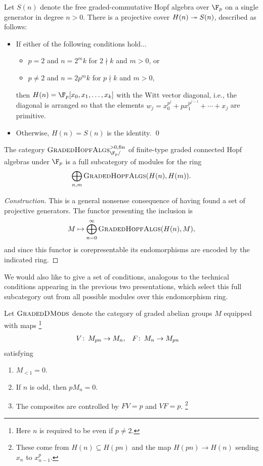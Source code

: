 \begin{theorem}
Let \(S(n)\) denote the free graded-commutative Hopf algebra over \(\F_p\) on a single generator in degree \(n > 0\).
There is a projective cover \(H(n) \twoheadrightarrow S(n)\), described as follows:
\begin{itemize}
\item If either of the following conditions hold...
\begin{itemize}
\item \(p = 2\) and \(n = 2^m k\) for \(2 \nmid k\) and \(m > 0\), or
\item \(p \ne 2\) and \(n = 2p^m k\) for \(p \nmid k\) and \(m > 0\),
\end{itemize}
then \(H(n) = \F_p[x_0, x_1, \ldots, x_k]\) with the Witt vector diagonal, i.e., the diagonal is arranged so that the elements \(w_j = x_0^{p^j} + p x_1^{p^{j-1}} + \cdots + x_j\) are primitive.
\item Otherwise, \(H(n) = S(n)\) is the identity.
\qed
\end{itemize}
\end{theorem}

\begin{corollary}
The category \(\CatOf{GradedHopfAlgs}^{> 0, \fin}_{\F_p/}\) of finite-type graded connected Hopf algebras under \(\F_p\) is a full subcategory of modules for the ring \[\bigoplus_{n, m} \normalfont\textsc{GradedHopfAlgs}(H(n), H(m)).\]
\end{corollary}
\begin{proof}[Construction]
This is a general nonsense consequence of having found a set of projective generators.
The functor presenting the inclusion is \[M \mapsto \bigoplus_{n=0}^\infty \normalfont\textsc{GradedHopfAlgs}(H(n), M),\] and since this functor is corepresentable its endomorphisms are encoded by the indicated ring.
\end{proof}

We would also like to give a set of conditions, analogous to the technical conditions appearing in the previous two presentations, which select this full subcategory out from all possible modules over this endomorphism ring.

\begin{definition}
Let \(\normalfont\textsc{GradedDMods}\) denote the category of graded abelian groups \(M\) equipped with maps%
\footnote{%
Here \(n\) is required to be even if \(p \ne 2\).
}
\begin{align*}
V\colon\thinspace M_{pn} & \to M_n, &
F\colon\thinspace M_n & \to M_{pn}
\end{align*}
satisfying
\begin{enumerate}
\item \(M_{< 1} = 0\).
\item If \(n\) is odd, then \(pM_n = 0\).
\item The composites are controlled by \(FV = p\) and \(VF = p\).%
\footnote{%
These come from \(H(n) \subseteq H(pn)\) and the map \(H(pn) \to H(n)\) sending \(x_n\) to \(x_{n-1}^p\).
}
\end{enumerate}
\end{definition}

